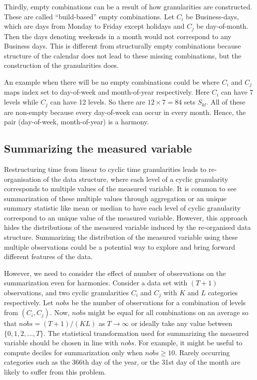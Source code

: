 \documentclass[12pt]{article}
\begin{document}
\noindent Thirdly, empty combinations can be a result of how granularities are constructed. These are called ``build-based'' empty combinations. Let \(C_i\) be Business-days, which are days from Monday to Friday except holidays and \(C_j\) be day-of-month. Then the days denoting weekends in a month would not correspond to any Business days. This is different from structurally empty combinations because structure of the calendar does not lead to these missing combinations, but the construction of the granularities does.

\noindent An example when there will be no empty combinations could be where \(C_i\) and \(C_j\) maps index set to day-of-week and month-of-year respectively. Here \(C_i\) can have 7 levels while \(C_j\) can have 12 levels. So there are \(12\times7=84\) sets \(S_{kl}\). All of these are non-empty because every day-of-week can occur in every month. Hence, the pair (day-of-week, month-of-year) is a harmony.

\hypertarget{sec:summarize-measured}{%
\subsection{Summarizing the measured variable}\label{sec:summarize-measured}}

Restructuring time from linear to cyclic time granularities leads to re-organisation of the data structure, where each level of a cyclic granularity corresponds to multiple values of the measured variable. It is common to see summarization of these multiple values through aggregation or an unique summary statistic like mean or median to have each level of cyclic granularity correspond to an unique value of the measured variable. However, this approach hides the distributions of the measured variable induced by the re-organised data structure. Summarizing the distribution of the measured variable using these multiple observations could be a potential way to explore and bring forward different features of the data.

However, we need to consider the effect of number of observations on the summarization even for harmonies. Consider a data set with \((T + 1)\) observations, and two cyclic granularities \(C_i\) and \(C_j\) with \(K\) and \(L\) categories respectively. Let \(nobs\) be the number of observations for a combination of levels from \((C_i, C_j)\). Now, \(nobs\) might be equal for all combinations on an average so that \(nobs = (T + 1)/(KL)\) as \(T\rightarrow\infty\) or ideally take any value between \(\{0, 1, 2, \dots, T\}\). The statistical transformation used for summarizing the measured variable should be chosen in line with \(nobs\). For example, it might be useful to compute deciles for summarization only when \(nobs \ge 10\). Rarely occurring categories such as the 366th day of the year, or the 31st day of the month are likely to suffer from this problem.
\end{document}
